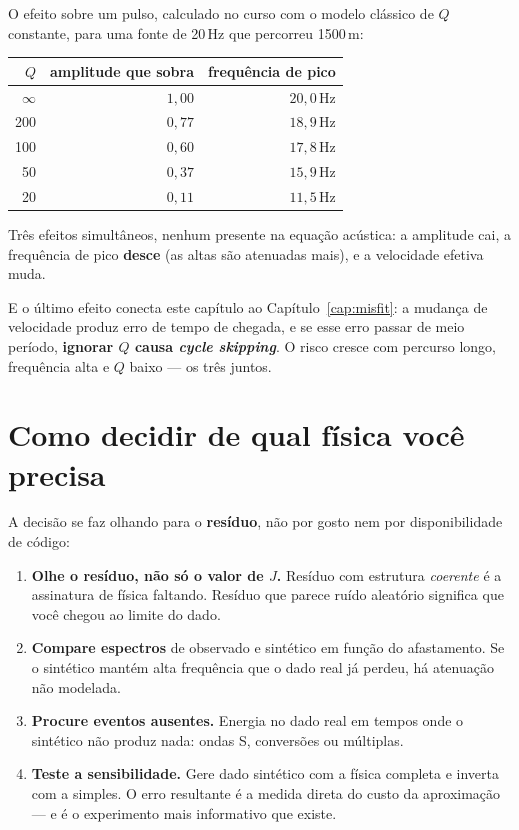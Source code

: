 \documentclass[11pt,a4paper,oneside]{report}
\begin{document}
O efeito sobre um pulso, calculado no curso com o modelo cl\'assico de
$Q$ constante, para uma fonte de 20\,Hz que percorreu 1500\,m:

\begin{center}
\begin{tabular}{@{}rrr@{}}
\toprule
$Q$ & \textbf{amplitude que sobra} & \textbf{frequ\^encia de pico} \\
\midrule
$\infty$ & $1{,}00$ & $20{,}0$\,Hz \\
200 & $0{,}77$ & $18{,}9$\,Hz \\
100 & $0{,}60$ & $17{,}8$\,Hz \\
50  & $0{,}37$ & $15{,}9$\,Hz \\
20  & $0{,}11$ & $11{,}5$\,Hz \\
\bottomrule
\end{tabular}
\end{center}

Tr\^es efeitos simult\^aneos, nenhum presente na equa\c{c}\~ao ac\'ustica: a
amplitude cai, a frequ\^encia de pico \textbf{desce} (as altas s\~ao
atenuadas mais), e a velocidade efetiva muda.

E o \'ultimo efeito conecta este cap\'itulo ao Cap\'itulo~\ref{cap:misfit}: a
mudan\c{c}a de velocidade produz erro de tempo de chegada, e se esse erro
passar de meio per\'iodo, \textbf{ignorar $Q$ causa \emph{cycle skipping}}. O
risco cresce com percurso longo, frequ\^encia alta e $Q$ baixo --- os tr\^es
juntos.

\section{Como decidir de qual f\'isica voc\^e precisa}

A decis\~ao se faz olhando para o \textbf{res\'iduo}, n\~ao por gosto nem por
disponibilidade de c\'odigo:

\begin{enumerate}[leftmargin=*]
\item \textbf{Olhe o res\'iduo, n\~ao s\'o o valor de $J$.} Res\'iduo com
estrutura \emph{coerente} \'e a assinatura de f\'isica faltando. Res\'iduo que
parece ru\'ido aleat\'orio significa que voc\^e chegou ao limite do dado.
\item \textbf{Compare espectros} de observado e sint\'etico em fun\c{c}\~ao do
afastamento. Se o sint\'etico mant\'em alta frequ\^encia que o dado real j\'a
perdeu, h\'a atenua\c{c}\~ao n\~ao modelada.
\item \textbf{Procure eventos ausentes.} Energia no dado real em tempos onde o
sint\'etico n\~ao produz nada: ondas S, convers\~oes ou m\'ultiplas.
\item \textbf{Teste a sensibilidade.} Gere dado sint\'etico com a f\'isica
completa e inverta com a simples. O erro resultante \'e a medida direta do
custo da aproxima\c{c}\~ao --- e \'e o experimento mais informativo que
existe.
\end{enumerate}
\end{document}
